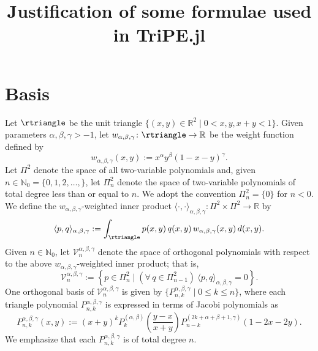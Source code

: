 \documentclass{article}
\title{Justification of some formulae used in TriPE.jl}
\author{}
\date{}
\numberwithin{equation}{section}
\numberwithin{figure}{section}
\begin{document}
\maketitle

\section{Basis}

Let $\rtriangle$ be the unit triangle $\{ (x,y) \in \mathbb{R}^2 \mid 0 < x, y, x+y < 1 \}$.
Given parameters $\alpha, \beta, \gamma > -1$, let $w_{\alpha,\beta,\gamma} \colon \rtriangle \to \mathbb{R}$ be the weight function defined by
%
\begin{equation*}
w_{\alpha,\beta,\gamma}(x,y) := x^\alpha y^\beta (1-x-y)^\gamma.
\end{equation*}
%
Let $\Pi^2$ denote the space of all two-variable polynomials and, given $n \in \mathbb{N}_0 = \{0, 1, 2, \dotsc, \}$, let $\Pi^2_n$ denote the space of two-variable polynomials of total degree less than or equal to $n$.
We adopt the convention $\Pi^2_n = \{ 0 \}$ for $n < 0$.
We define the $w_{\alpha,\beta,\gamma}$-weighted inner product $\langle \cdot, \cdot \rangle_{\alpha,\beta,\gamma} \colon \Pi^2 \times \Pi^2 \to \mathbb{R}$ by
%
\begin{equation*}
\langle p, q \rangle_{\alpha,\beta,\gamma} := \int_\rtriangle p(x,y) \, q(x,y) \, w_{\alpha,\beta,\gamma}(x,y) \, d(x,y).
\end{equation*}
%
Given $n \in \mathbb{N}_0$, let $\mathcal{V}^{\alpha,\beta,\gamma}_n$ denote the space of orthogonal polynomials with respect to the above $w_{\alpha,\beta,\gamma}$-weighted inner product; that is,
%
\begin{equation*}
\mathcal{V}^{\alpha,\beta,\gamma}_n := \left\{ p \in \Pi^2_n \mid (\forall\,q\in\Pi^2_{n-1})\ \langle p, q \rangle_{\alpha,\beta,\gamma} = 0 \right\}.
\end{equation*}
%
One orthogonal basis of $\mathcal{V}^{\alpha,\beta,\gamma}_n$ is given by $\{ P^{\alpha,\beta,\gamma}_{n,k} \mid 0 \leq k \leq n \}$, where each triangle polynomial $P^{\alpha,\beta,\gamma}_{n,k}$ is expressed in terms of Jacobi polynomials as \cite[\S~2.4]{DunklXu:2014} \cite[\S~4.1]{Xu:2017b}
%
\begin{equation}\label{trianglePolynomial}
P^{\alpha,\beta,\gamma}_{n,k}(x,y) := (x+y)^k P^{(\alpha,\beta)}_k\mathopen{}\left( \frac{y-x}{x+y} \mathclose{}\right) P^{(2k+\alpha+\beta+1,\gamma)}_{n-k}(1-2x-2y).
\end{equation}
%
We emphasize that each $P^{\alpha,\beta,\gamma}_{n,k}$ is of total degree $n$.
\end{document}
